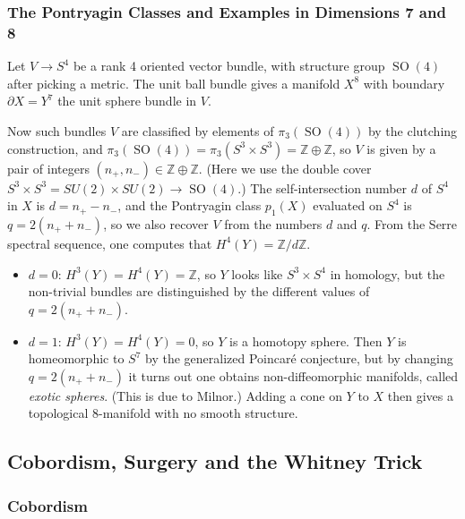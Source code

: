 \documentclass{article}
\theoremstyle{definition}
\DeclareMathOperator{\SO}{SO}
\newcommand{\Z}{\mathbb{Z}}
\begin{document}
\subsubsection*{The Pontryagin Classes and Examples in Dimensions 7 and 8}

Let $V\to S^4$ be a rank 4 oriented vector bundle, with structure group $\SO(4)$
after picking a metric. The unit ball bundle gives a manifold $X^8$ with
boundary $\partial X=Y^7$ the unit sphere bundle in $V$.

Now such bundles $V$ are classified by elements of $\pi_3(\SO(4))$ by the
clutching construction, and $\pi_3(\SO(4))=\pi_3(S^3\times S^3)=\Z\oplus\Z$, so
$V$ is given by a pair of integers $(n_+,n_-)\in\Z\oplus\Z$. (Here we use the
double cover $S^3\times S^3=SU(2)\times SU(2)\to\SO(4)$.) The self-intersection
number $d$ of $S^4$ in $X$ is $d=n_+-n_-$, and the Pontryagin class $p_1(X)$
evaluated on $S^4$ is $q=2(n_++n_-)$, so we also recover $V$ from the numbers
$d$ and $q$. From the Serre spectral sequence, one computes that
$H^4(Y)=\Z/d\Z$.
\begin{itemize}
    \item $d=0$: $H^3(Y)=H^4(Y)=\Z$, so $Y$ looks like $S^3\times S^4$ in
        homology, but the non-trivial bundles are distinguished by the different
        values of $q=2(n_++n_-)$.

    \item $d=1$: $H^3(Y)=H^4(Y)=0$, so $Y$ is a homotopy sphere. Then $Y$ is
        homeomorphic to $S^7$ by the generalized Poincar\'e conjecture, but by
        changing $q=2(n_++n_-)$ it turns out one obtains non-diffeomorphic
        manifolds, called \emph{exotic spheres}. (This is due to Milnor.) Adding
        a cone on $Y$ to $X$ then gives a topological 8-manifold with no smooth
        structure.
\end{itemize}

\subsection{Cobordism, Surgery and the Whitney Trick}

\subsubsection*{Cobordism}
\end{document}
